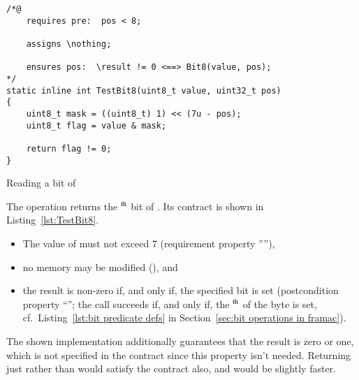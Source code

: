 \begin{listing}[hbt]
\begin{minipage}{0.99\textwidth}
\begin{lstlisting}[style=acsl-block]
/*@
    requires pre:  pos < 8;

    assigns \nothing;

    ensures pos:  \result != 0 <==> Bit8(value, pos);
*/
static inline int TestBit8(uint8_t value, uint32_t pos)
{
    uint8_t mask = ((uint8_t) 1) << (7u - pos);
    uint8_t flag = value & mask;

    return flag != 0;
}
\end{lstlisting}
\end{minipage}
\caption{\label{lst:TestBit8}Reading a bit of }
\end{listing}










The operation  returns the
$^{\mbox{\scriptsize th}}$
bit of .
%
Its contract is shown in Listing~\ref{lst:TestBit8}.
%
\begin{itemize}
\item The value of  must not exceed 7 
	(requirement property ''''),
\item no memory may be modified (), and 
\item the result is non-zero if, and only
	if, the specified bit is set (postcondition property
	``''; the call  succeeds 
	if, and only if, the $^{\mbox{\scriptsize th}}$ of
	the byte  is set, 
	cf.\ Listing~\ref{lst:bit predicate defs} in
	Section~\ref{sec:bit operations in framac}).
\end{itemize}
%
The shown implementation additionally guarantees that the result is
zero or one, which
is not specified in the contract since this property isn't needed.
%
Returning just  rather than 
would satisfy the
contract also, and would be slightly faster.






